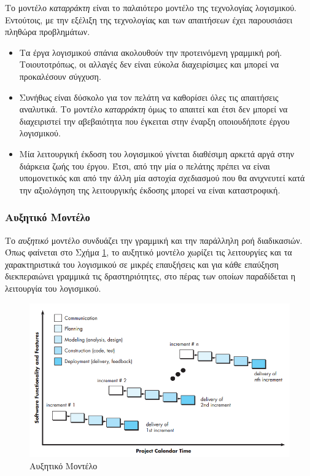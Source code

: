 Το μοντέλο \textsl{καταρράκτη} είναι το παλαιότερο μοντέλο της τεχνολογίας λογισμικού. Εντούτοις, με την εξέλιξη της τεχνολογίας και των απαιτήσεων έχει παρουσιάσει πληθώρα προβλημάτων.

\begin{itemize}
  \item Τα έργα λογισμικού σπάνια ακολουθούν την προτεινόμενη γραμμική ροή. Τοιουτοτρόπως, οι αλλαγές δεν είναι εύκολα διαχειρίσιμες και μπορεί να προκαλέσουν σύγχυση. 
  \item Συνήθως είναι δύσκολο για τον πελάτη να καθορίσει όλες τις απαιτήσεις αναλυτικά. Το μοντέλο \textsl{καταρράκτη} όμως το απαιτεί και έτσι δεν μπορεί να διαχειριστεί την αβεβαιότητα που έγκειται στην έναρξη οποιουδήποτε έργου λογισμικού.
  \item Μία λειτουργική έκδοση του λογισμικού γίνεται διαθέσιμη αρκετά αργά στην διάρκεια ζωής του έργου. Έτσι, από την μία ο πελάτης πρέπει να είναι υπομονετικός και από την άλλη μία αστοχία σχεδιασμού που θα ανιχνευτεί κατά την αξιολόγηση της λειτουργικής έκδοσης μπορεί να είναι καταστροφική.
\end{itemize}

\subsubsection{Αυξητικό Μοντέλο}

Το \textsl{αυξητικό} μοντέλο συνδυάζει την γραμμική και την παράλληλη ροή διαδικασιών. Όπως φαίνεται στο Σχήμα \ref{fig:incremental_process_model}, το αυξητικό μοντέλο χωρίζει τις λειτουργίες και τα χαρακτηριστικά του λογισμικού σε μικρές επαυξήσεις και για κάθε επαύξηση διεκπεραιώνει γραμμικά τις δραστηριότητες, στο πέρας των οποίων παραδίδεται η λειτουργία του λογισμικού.

\begin{figure}[h]
    \centering
    \includegraphics[scale=2]{images/chapter2/software_engineering/incremental_process_model.png}
    \caption{Αυξητικό Μοντέλο}
    \label{fig:incremental_process_model}
\end{figure}

